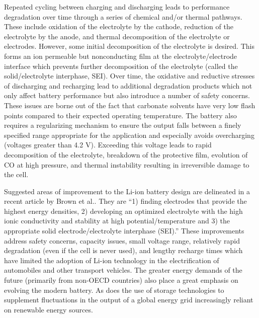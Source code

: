 \begin{intro}
   Repeated cycling between charging and discharging leads to performance degradation over time through a series of chemical and/or thermal pathways. These 
   include oxidation of the electrolyte by the cathode, reduction of the electrolyte by the anode, and thermal decomposition of the electrolyte or electrodes\cite{voelker2014trace}. 
   However, some initial decomposition of the electrolyte is desired. This forms an ion permeable but nonconducting film at the electrolyte/electrode interface which
   prevents further decomposition of the electrolyte (called the solid/electrolyte interphase, SEI). Over time, the oxidative and reductive stresses of discharging
   and recharging lead to additional degradation products which not only affect battery performance but also introduce a number of safety concerns. These issues are 
   borne out of the fact that carbonate solvents have very low flash points compared to their expected operating temperature. The battery also requires a regularizing 
   mechanism to ensure the output falls between a finely specified range appropriate for the application and especially avoids overcharging (voltages greater 
   than 4.2 V)\cite{ohsaki2005overcharge,ratnakumar2006li}. Exceeding this voltage leads to rapid decomposition of the electrolyte, breakdown of the protective film, 
   evolution of CO at high pressure, and thermal instability resulting in irreversible damage to the cell\cite{voelker2014trace}.
   
   Suggested areas of improvement to the Li-ion battery design are delineated in a recent article by Brown et al.\cite{brown2015ion}. They are ``1) finding 
   electrodes that provide the highest energy densities, 2) developing an optimized electrolyte with the high ionic conductivity and stability at high 
   potential/temperature and 3) the appropriate solid electrode/electrolyte interphase (SEI).'' These improvements address safety concerns, capacity issues,
   small voltage range, relatively rapid degradation (even if the cell is never used), and lengthy recharge times which have limited the adoption of Li-ion 
   technology in the electrification of automobiles and other transport vehicles. The greater energy demands of the future (primarily from non-OECD countries) 
   also place a great emphasis on evolving the modern battery\cite{eia}. As does the use of storage technologies to supplement fluctuations in the output of a
   global energy grid increasingly reliant on renewable energy sources.
   

\end{intro}
